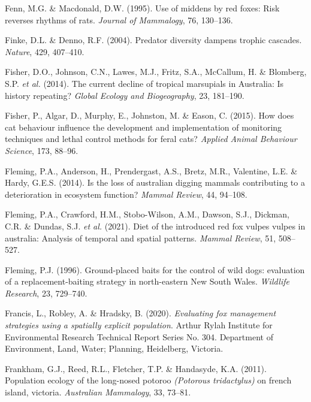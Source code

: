 \documentclass[11pt,a4paper,titlepage,twoside,openright]{style/unimelbthesis}
\begin{document}
\begin{mainmatter}
\leavevmode\hypertarget{ref-fenn1995use}{}%
Fenn, M.G. \& Macdonald, D.W. (1995). Use of middens by red foxes: Risk reverses rhythms of rats. \emph{Journal of Mammalogy}, 76, 130--136.

\leavevmode\hypertarget{ref-finke2004predator}{}%
Finke, D.L. \& Denno, R.F. (2004). Predator diversity dampens trophic cascades. \emph{Nature}, 429, 407--410.

\leavevmode\hypertarget{ref-fisher2014current}{}%
Fisher, D.O., Johnson, C.N., Lawes, M.J., Fritz, S.A., McCallum, H. \& Blomberg, S.P. \emph{et al.} (2014). The current decline of tropical marsupials in Australia: Is history repeating? \emph{Global Ecology and Biogeography}, 23, 181--190.

\leavevmode\hypertarget{ref-fisher2015cat}{}%
Fisher, P., Algar, D., Murphy, E., Johnston, M. \& Eason, C. (2015). How does cat behaviour influence the development and implementation of monitoring techniques and lethal control methods for feral cats? \emph{Applied Animal Behaviour Science}, 173, 88--96.

\leavevmode\hypertarget{ref-fleming2014loss}{}%
Fleming, P.A., Anderson, H., Prendergast, A.S., Bretz, M.R., Valentine, L.E. \& Hardy, G.E.S. (2014). Is the loss of australian digging mammals contributing to a deterioration in ecosystem function? \emph{Mammal Review}, 44, 94--108.

\leavevmode\hypertarget{ref-fleming2021diet}{}%
Fleming, P.A., Crawford, H.M., Stobo-Wilson, A.M., Dawson, S.J., Dickman, C.R. \& Dundas, S.J. \emph{et al.} (2021). Diet of the introduced red fox vulpes vulpes in australia: Analysis of temporal and spatial patterns. \emph{Mammal Review}, 51, 508--527.

\leavevmode\hypertarget{ref-fleming1996ground}{}%
Fleming, P.J. (1996). Ground-placed baits for the control of wild dogs: evaluation of a replacement-baiting strategy in north-eastern New South Wales. \emph{Wildlife Research}, 23, 729--740.

\leavevmode\hypertarget{ref-francis2020evaluating}{}%
Francis, L., Robley, A. \& Hradsky, B. (2020). \emph{Evaluating fox management strategies using a spatially explicit population}. Arthur Rylah Institute for Environmental Research Technical Report Series No. 304. Department of Environment, Land, Water; Planning, Heidelberg, Victoria.

\leavevmode\hypertarget{ref-frankham2011population}{}%
Frankham, G.J., Reed, R.L., Fletcher, T.P. \& Handasyde, K.A. (2011). Population ecology of the long-nosed potoroo \emph{(Potorous tridactylus)} on french island, victoria. \emph{Australian Mammalogy}, 33, 73--81.


\end{mainmatter}
\end{document}
